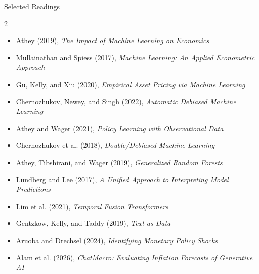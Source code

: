 \documentclass[aspectratio=169,11pt]{beamer}
\begin{document}
\begin{frame}{Selected Readings}
\begin{multicols}{2}
\scriptsize
\begin{itemize}
    \item Athey (2019), \textit{The Impact of Machine Learning on Economics}
    \item Mullainathan and Spiess (2017), \textit{Machine Learning: An Applied Econometric Approach}
    \item Gu, Kelly, and Xiu (2020), \textit{Empirical Asset Pricing via Machine Learning}
    \item Chernozhukov, Newey, and Singh (2022), \textit{Automatic Debiased Machine Learning}
    \item Athey and Wager (2021), \textit{Policy Learning with Observational Data}
    \item Chernozhukov et al. (2018), \textit{Double/Debiased Machine Learning}
    \item Athey, Tibshirani, and Wager (2019), \textit{Generalized Random Forests}
    \item Lundberg and Lee (2017), \textit{A Unified Approach to Interpreting Model Predictions}
    \item Lim et al. (2021), \textit{Temporal Fusion Transformers}
    \item Gentzkow, Kelly, and Taddy (2019), \textit{Text as Data}
    \item Aruoba and Drechsel (2024), \textit{Identifying Monetary Policy Shocks}
    \item Alam et al. (2026), \textit{ChatMacro: Evaluating Inflation Forecasts of Generative AI}
\end{itemize}
\end{multicols}
\end{frame}
\end{document}
